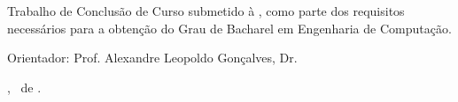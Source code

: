 \begin{titlepage}
	\vfill
	\begin{center}
		\ABNTautordata \\[5cm]
		
		\tituloformat{\ABNTtitulodata} 
		\tituloformat{\subtitulodata} \\[1cm]
		
		
		\hspace{.45\textwidth} %
		\begin{minipage}{.5\textwidth}
			\begin{espacosimples}
				
				\textnormal{Trabalho de Conclusão de Curso submetido à \ABNTinstituicaodata,
				como parte dos requisitos necessários para a obtenção do Grau de
				Bacharel em Engenharia de Computação.}
				
				\textnormal{Orientador: Prof. Alexandre Leopoldo Gonçalves, Dr.}
			\end{espacosimples}
		\end{minipage}
		\vfill \localformat \ABNTlocaldata, \mesdata\ de \anodata.
	\end{center}
	\vspace{1cm}
\end{titlepage}



